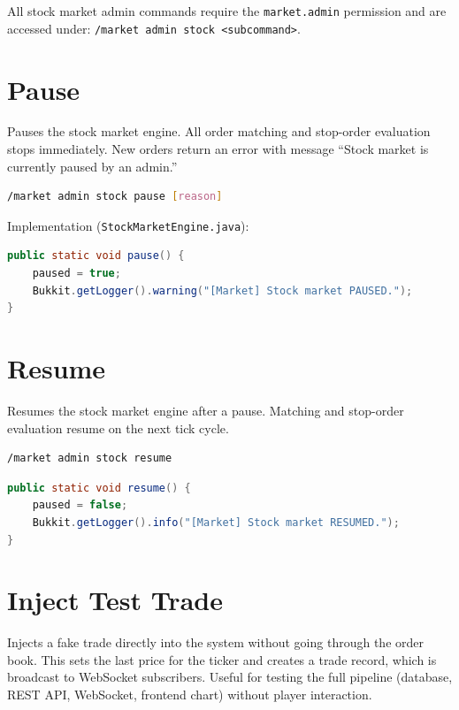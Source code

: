 \documentclass[12pt,a4paper]{report}
\begin{document}
All stock market admin commands require the \texttt{market.admin} permission
and are accessed under: \texttt{/market admin stock <subcommand>}.

\section{Pause}

Pauses the stock market engine. All order matching and stop-order evaluation
stops immediately. New orders return an error with message
``Stock market is currently paused by an admin.''

\begin{lstlisting}[language=sh, caption=Usage]
/market admin stock pause [reason]
\end{lstlisting}

Implementation (\texttt{StockMarketEngine.java}):

\begin{lstlisting}[language=Java, caption=Pause implementation]
public static void pause() {
    paused = true;
    Bukkit.getLogger().warning("[Market] Stock market PAUSED.");
}
\end{lstlisting}

\section{Resume}

Resumes the stock market engine after a pause. Matching and stop-order
evaluation resume on the next tick cycle.

\begin{lstlisting}[language=sh, caption=Usage]
/market admin stock resume
\end{lstlisting}

\begin{lstlisting}[language=Java, caption=Resume implementation]
public static void resume() {
    paused = false;
    Bukkit.getLogger().info("[Market] Stock market RESUMED.");
}
\end{lstlisting}

\section{Inject Test Trade}

Injects a fake trade directly into the system without going through the
order book. This sets the last price for the ticker and creates a trade
record, which is broadcast to WebSocket subscribers. Useful for testing
the full pipeline (database, REST API, WebSocket, frontend chart) without
player interaction.
\end{document}
